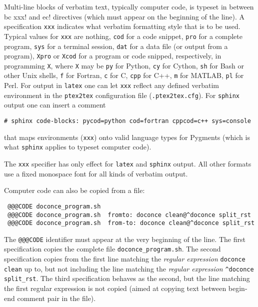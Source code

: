 \documentclass[twoside]{article}
\begin{document}
Multi-line blocks of verbatim text, typically computer code, is typeset
in between {\fontsize{10pt}{10pt}\verb!!bc xxx!} and {\fontsize{10pt}{10pt}\verb!!ec!} directives (which must appear on the
beginning of the line). A specification {\fontsize{10pt}{10pt}\verb!xxx!} indicates what verbatim
formatting style that is to be used. Typical values for {\fontsize{10pt}{10pt}\verb!xxx!} are
nothing, {\fontsize{10pt}{10pt}\verb!cod!} for a code snippet, {\fontsize{10pt}{10pt}\verb!pro!} for a complete program,
{\fontsize{10pt}{10pt}\verb!sys!} for a terminal session, {\fontsize{10pt}{10pt}\verb!dat!} for a data file (or output from a
program),
{\fontsize{10pt}{10pt}\verb!Xpro!} or {\fontsize{10pt}{10pt}\verb!Xcod!} for a program or code snipped, respectively,
in programming {\fontsize{10pt}{10pt}\verb!X!}, where {\fontsize{10pt}{10pt}\verb!X!} may be {\fontsize{10pt}{10pt}\verb!py!} for Python,
{\fontsize{10pt}{10pt}\verb!cy!} for Cython, {\fontsize{10pt}{10pt}\verb!sh!} for Bash or other Unix shells,
{\fontsize{10pt}{10pt}\verb!f!} for Fortran, {\fontsize{10pt}{10pt}\verb!c!} for C, {\fontsize{10pt}{10pt}\verb!cpp!} for C++, {\fontsize{10pt}{10pt}\verb!m!} for MATLAB,
{\fontsize{10pt}{10pt}\verb!pl!} for Perl. For output in {\fontsize{10pt}{10pt}\verb!latex!} one can let {\fontsize{10pt}{10pt}\verb!xxx!} reflect any
defined verbatim environment in the {\fontsize{10pt}{10pt}\verb!ptex2tex!} configuration file
({\fontsize{10pt}{10pt}\verb!.ptex2tex.cfg!}). For {\fontsize{10pt}{10pt}\verb!sphinx!} output one can insert a comment
\begin{Verbatim}
# sphinx code-blocks: pycod=python cod=fortran cppcod=c++ sys=console
\end{Verbatim}
that maps environments ({\fontsize{10pt}{10pt}\verb!xxx!}) onto valid language types for
Pygments (which is what {\fontsize{10pt}{10pt}\verb!sphinx!} applies to typeset computer code).

The {\fontsize{10pt}{10pt}\verb!xxx!} specifier has only effect for {\fontsize{10pt}{10pt}\verb!latex!} and
{\fontsize{10pt}{10pt}\verb!sphinx!} output. All other formats use a fixed monospace font for all
kinds of verbatim output.

Computer code can also be copied from a file:
\begin{Verbatim}
 @@@CODE doconce_program.sh
 @@@CODE doconce_program.sh  fromto: doconce clean@^doconce split_rst
 @@@CODE doconce_program.sh  from-to: doconce clean@^doconce split_rst
\end{Verbatim}
The {\fontsize{10pt}{10pt}\verb!@@@CODE!} identifier must appear at the very beginning of the line.
The first specification copies the complete file {\fontsize{10pt}{10pt}\verb!doconce_program.sh!}.
The second specification copies from the first line matching the \emph{regular
expression} {\fontsize{10pt}{10pt}\verb!doconce clean!} up to, but not including the line
matching the \emph{regular expression} {\fontsize{10pt}{10pt}\verb!^doconce split_rst!}.
The third specification behaves as the second, but the line matching
the first regular expression is not copied (aimed at copying
text between begin-end comment pair in the file).
\end{document}
